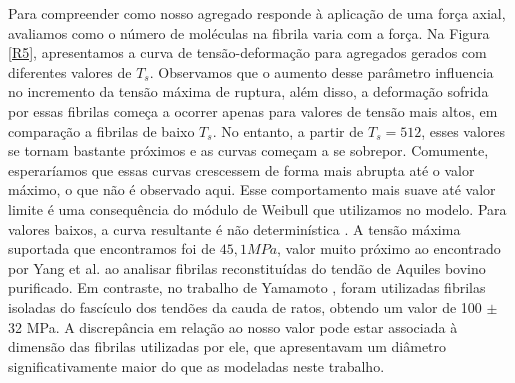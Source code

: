 \documentclass[11pt,a4paper]{article} %
\begin{document}
        Para compreender como nosso agregado responde à aplicação de uma força axial, avaliamos como o número de  
        moléculas na fibrila varia com a força. Na Figura \ref{R5}, apresentamos a curva de tensão-deformação para agregados  
        gerados com diferentes valores de \(T_{s}\). Observamos que o aumento desse parâmetro influencia no incremento da  
        tensão máxima de ruptura, além disso, a deformação sofrida por essas fibrilas começa a ocorrer apenas para valores  
        de tensão mais altos, em comparação a fibrilas de baixo \(T_{s}\). No entanto, a partir de \(T_{s} = 512\), esses  
        valores se tornam bastante próximos e as curvas começam a se sobrepor. Comumente, esperaríamos que essas curvas  
        crescessem de forma mais abrupta até o valor máximo, o que não é observado aqui. Esse comportamento mais suave até  
        valor limite é uma consequência do módulo de Weibull que utilizamos no modelo. Para valores baixos, a curva resultante  
        é não determinística \cite{Parkinson1997}. A tensão máxima suportada que encontramos foi de \(45,1 MPa\), valor muito  
        próximo ao encontrado por Yang et al. \cite{YANG2012148} ao analisar fibrilas reconstituídas do tendão de Aquiles  
        bovino purificado. Em contraste, no trabalho de Yamamoto \cite{Noritaka}, foram utilizadas fibrilas isoladas do  
        fascículo dos tendões da cauda de ratos, obtendo um valor de 100 \(\pm\) 32 MPa. A discrepância em relação ao nosso  
        valor pode estar associada à dimensão das fibrilas utilizadas por ele, que apresentavam um diâmetro significativamente  
        maior do que as modeladas neste trabalho. 
\end{document}
